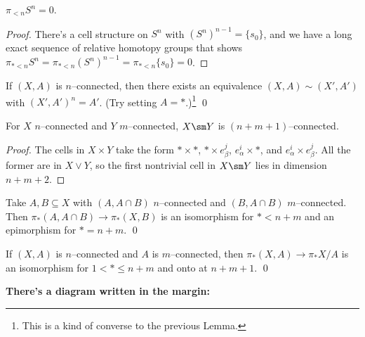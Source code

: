\begin{corollary}
$\pi_{< n} S^n = 0$.
\end{corollary}
\begin{proof}
There's a cell structure on $S^n$ with $(S^n)^{n-1} = \{s_0\}$, and we have a long exact sequence of relative homotopy groups that shows $\pi_{* < n} S^n = \pi_{* < n} (S^n)^{n-1} = \pi_{* < n} \{s_0\} = 0$.
\end{proof}

\begin{lemma}
If $(X, A)$ is $n$--connected, then there exists an equivalence $(X, A) \sim (X', A')$ with $(X', A')^n = A'$.  (Try setting $A = *$.)\footnote{This is a kind of converse to the previous Lemma.} \qed
\end{lemma}

\begin{corollary}
For $X$ $n$--connected and $Y$ $m$--connected, $X \sm Y$ is $(n+m+1)$--connected.
\end{corollary}
\begin{proof}
The cells in $X \times Y$ take the form $* \times *$, $* \times e_\beta^j$, $e_\alpha^i \times *$, and $e_\alpha^i \times e_\beta^j$.  All the former are in $X \vee Y$, so the first nontrivial cell in $X \sm Y$ lies in dimension $n + m + 2$.
\end{proof}

\begin{theorem}
Take $A, B \subseteq X$ with $(A, A \cap B)$ $n$--connected and $(B, A \cap B)$ $m$--connected.  Then $\pi_*(A, A \cap B) \to \pi_*(X, B)$ is an isomorphism for $* < n+m$ and an epimorphism for $* = n+m$. \qed
\end{theorem}

\begin{corollary}
If $(X, A)$ is $n$--connected and $A$ is $m$--connected, then $\pi_*(X, A) \to \pi_* X/A$ is an isomorphism for $1 < * \le n+m$ and onto at $n+m+1$. \qed

\textbf{There's a diagram written in the margin:}
\end{corollary}

